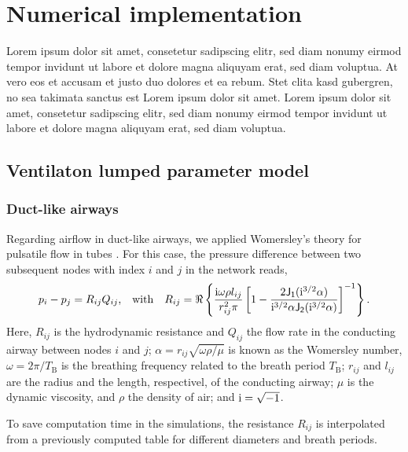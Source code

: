 \section{Numerical implementation} \label{sec:numerical_implementation}
Lorem ipsum dolor sit amet, consetetur sadipscing elitr, sed diam nonumy eirmod tempor invidunt ut labore et dolore magna aliquyam erat, sed diam voluptua. At vero eos et accusam et justo duo dolores et ea rebum. Stet clita kasd gubergren, no sea takimata sanctus est Lorem ipsum dolor sit amet. Lorem ipsum dolor sit amet, consetetur sadipscing elitr, sed diam nonumy eirmod tempor invidunt ut labore et dolore magna aliquyam erat, sed diam voluptua.


\subsection{Ventilaton lumped parameter model} \label{ssec:ventilation}
\subsubsection{Duct-like airways}
Regarding airflow in duct-like airways, we applied Womersley's theory for pulsatile flow in tubes \cite{Womersley1957}.
For this case, the pressure difference between two subsequent nodes with index $i$ and $j$ in the network reads,
\begin{equation}
p_i - p_j = R_{ij} Q_{ij}\text{,} \quad{\mathrm{with}}\quad R_{ij} = \Re\left\{\frac{\mathrm{i} \omega \rho l_{ij}}{r_{ij}^2 \pi}\left[1-\frac{2\mathsf{J_1}(\mathrm{i}^{3/2}\alpha)}{\mathrm{i}^{3/2}\alpha \mathsf{J_2}(\mathrm{i}^{3/2}\alpha)}\right]^{-1}\right\} \text{.}
\end{equation}
Here, $R_{ij}$ is the hydrodynamic resistance and $Q_{ij}$ the flow rate in the conducting airway between nodes $i$ and $j$; $\alpha = r_{ij}\sqrt{\omega\rho/\mu}$ is known as the Womersley number, $\omega = 2\pi/T_\mathrm{B}$ is the breathing frequency related to the breath period $T_\mathrm{B}$; $r_{ij}$ and $l_{ij}$ are the radius and the length, respectivel, of the conducting airway; $\mu$ is the dynamic viscosity, and $\rho$ the density of air; and $\mathrm{i} = \sqrt{-1}$.

To save computation time in the simulations, the resistance $R_{ij}$ is interpolated from a previously computed table for different diameters and breath periods.

